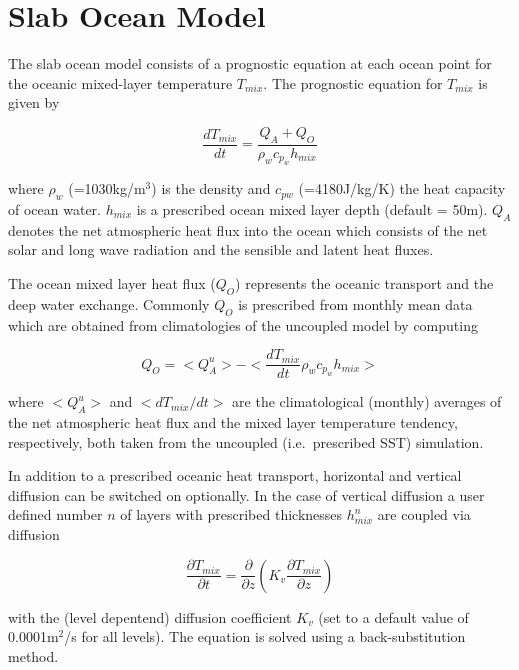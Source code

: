 \chapter{Slab Ocean Model}


The slab ocean model consists of a  prognostic equation at each ocean 
point for the oceanic mixed-layer temperature $T_{mix}$.
The prognostic equation for $T_{mix}$ is given by


\begin{equation}
\frac{dT_{mix}}{dt} = \frac{Q_A+Q_O}{\rho_w c_{p_w} h_{mix}}
\end{equation}

where $\rho_w$ (=1030kg/m$^3$) is the density and $c_{pw}$ (=4180J/kg/K) 
the heat capacity of ocean water. 
$h_{mix}$ is a prescribed ocean mixed layer depth (default = 50m). 
$Q_A$ denotes the net atmospheric heat flux into the ocean 
which consists of the net solar and long wave radiation 
and the sensible and latent heat fluxes. 

The ocean mixed layer heat flux ($Q_O$) represents the oceanic transport and 
the deep water exchange. Commonly $Q_O$ is prescribed from monthly mean data
which are obtained from climatologies of the uncoupled model by computing    

\begin{equation}
Q_{O} = <Q_{A}^{u}> - <\frac {dT_{mix}}{dt} \rho_w c_{p_w} h_{mix}>
\end{equation}

where $<Q_{A}^{u}>$ and $<dT_{mix}/{dt}>$ 
are the climatological (monthly) 
averages of the net
atmospheric heat flux and the mixed layer temperature tendency, 
respectively, both taken from the uncoupled (i.e.~prescribed SST) simulation.

In addition to a prescribed oceanic heat transport, horizontal and 
vertical diffusion can be switched on optionally. 
In the case of vertical diffusion 
a user defined number $n$ of layers with prescribed thicknesses $h_{mix}^{n}$ 
are coupled via diffusion

\begin{equation}
\frac{\partial T_{mix}}{\partial t} = \frac{\partial}{\partial z} \left( K_v
\frac{\partial T_{mix}}{\partial z} \right)
\end{equation}

with the (level depentend) diffusion coefficient $K_v$ (set to a default value
of 0.0001m$^2$/s for all levels). The equation is solved using a 
back-substitution method.

